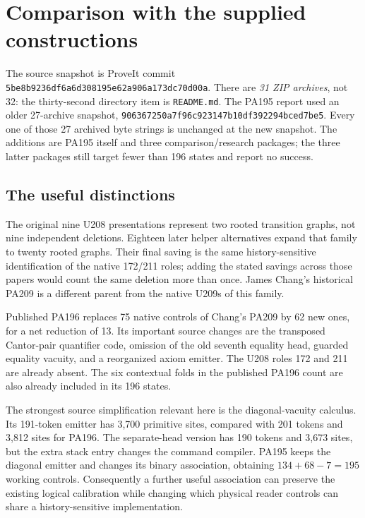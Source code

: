 \section{Comparison with the supplied constructions}
\label{sec:comparison}

The source snapshot is ProveIt commit
\texttt{5be8b9236df6a6d308195e62a906a173dc70d00a}.
There are \emph{31 ZIP archives}, not 32: the thirty-second directory item is
\texttt{README.md}. The PA195 report used an older 27-archive snapshot,
\texttt{906367250a7f96c923147b10df392294bced7be5}.
Every one of those 27 archived byte strings is unchanged at the new snapshot.
The additions are PA195 itself and three comparison/research packages; the
three latter packages still target fewer than 196 states and report no success.

\subsection{The useful distinctions}
The original nine U208 presentations represent two rooted transition graphs,
not nine independent deletions. Eighteen later helper alternatives expand that
family to twenty rooted graphs. Their final saving is the same history-sensitive
identification of the native 172/211 roles; adding the stated savings across
those papers would count the same deletion more than once. James Chang's
historical PA209 is a different parent from the native U209s of this family.

Published PA196 replaces 75 native controls of Chang's PA209 by 62 new ones,
for a net reduction of 13. Its important source changes are the transposed
Cantor-pair quantifier code, omission of the old seventh equality head, guarded
equality vacuity, and a reorganized axiom emitter. The U208 roles 172 and 211
are already absent. The six contextual folds in the published PA196 count are
also already included in its 196 states.

The strongest source simplification relevant here is the diagonal-vacuity
calculus. Its 191-token emitter has 3,700 primitive sites, compared with
201 tokens and 3,812 sites for PA196. The separate-head version has 190 tokens
and 3,673 sites, but the extra stack entry changes the command compiler.
PA195 keeps the diagonal emitter and changes its binary association, obtaining
\(134+68-7=195\) working controls. Consequently a further useful association
can preserve the existing logical calibration while changing which physical
reader controls can share a history-sensitive implementation.

